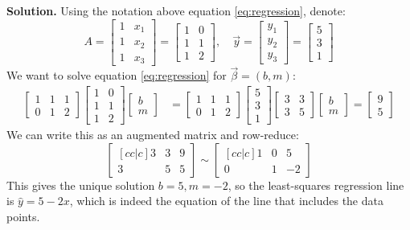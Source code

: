 \documentclass[11pt, letterpaper]{report}
\newenvironment{notes}{}{}
\newenvironment{book}{}{}
\newcommand{\bbvec}[2]{
  \begin{bmatrix} #1 \\ #2 \end{bmatrix}
}
\newcommand{\bbbvec}[3]{
  \begin{bmatrix} #1 \\ #2 \\ #3 \end{bmatrix}
}
\begin{document}
\begin{notes}
\vfill
\end{notes}

\begin{book}
\textbf{Solution.} Using the notation above equation \ref{eq:regression}, denote:
\[A=\begin{bmatrix}
1 & x_1 \\
1 & x_2 \\
1 & x_3
\end{bmatrix} = \begin{bmatrix}
1 & 0 \\
1 & 1 \\
1 & 2 
\end{bmatrix}, \quad \vec{y}=\bbbvec{y_1}{y_2}{y_3}= \bbbvec{5}{3}{1}\]
We want to solve equation \ref{eq:regression} for $\vec{\beta}=(b,m)$:
\begin{align*}
\begin{bmatrix}
1 & 1 & 1 \\
0 & 1 & 2
\end{bmatrix}\begin{bmatrix}
1 & 0 \\
1 & 1 \\
1 & 2
\end{bmatrix}\bbvec{b}{m} &= \begin{bmatrix}
1 & 1 & 1 \\
0 & 1 & 2
\end{bmatrix}\bbbvec{5}{3}{1}
\begin{bmatrix}
3 & 3 \\
3 & 5
\end{bmatrix} \bbvec{b}{m} = \bbvec{9}{5}
\end{align*}
We can write this as an augmented matrix and row-reduce:
\[\begin{bmatrix}[cc|c]
3 & 3 & 9 \\
3 & 5 & 5
\end{bmatrix} \sim \begin{bmatrix}[cc|c]
1 & 0 & 5 \\
0 & 1 & -2
\end{bmatrix}\]
This gives the unique solution $b=5,m=-2$, so the least-squares regression line is $\hat{y}=5-2x$, which is indeed the equation of the line that includes the data points. \blacksquare
\end{book}

\begin{notes}
\vspace{2em}
\end{notes}
\end{document}

